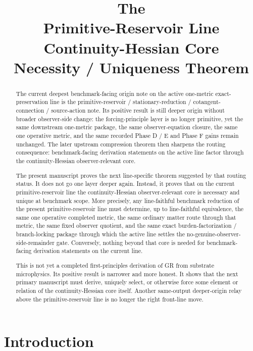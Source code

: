 \documentclass[11pt]{article}
\title{\textbf{The \TheoryName{}}\\[0.4em]
\large Primitive-Reservoir Line Continuity-Hessian Core\\
\large Necessity / Uniqueness Theorem}
\author{}
\date{}
\begin{document}
\maketitle

\begin{abstract}
The current deepest benchmark-facing origin note on the active one-metric exact-preservation line is the primitive-reservoir / stationary-reduction / cotangent-connection / source-action note. Its positive result is still deeper origin without broader observer-side change: the forcing-principle layer is no longer primitive, yet the same downstream one-metric package, the same observer-equation closure, the same one operative metric, and the same recorded Phase D / E and Phase F gains remain unchanged. The later upstream compression theorem then sharpens the routing consequence: benchmark-facing derivation statements on the active line factor through the continuity-Hessian observer-relevant core.

The present manuscript proves the next line-specific theorem suggested by that routing status. It does not go one layer deeper again. Instead, it proves that on the current primitive-reservoir line the continuity-Hessian observer-relevant core is necessary and unique at benchmark scope. More precisely, any line-faithful benchmark reduction of the present primitive-reservoir line must determine, up to line-faithful equivalence, the same one operative completed metric, the same ordinary matter route through that metric, the same fixed observer quotient, and the same exact burden-factorization / branch-locking package through which the active line settles the no-genuine-observer-side-remainder gate. Conversely, nothing beyond that core is needed for benchmark-facing derivation statements on the current line.

This is not yet a completed first-principles derivation of GR from substrate microphysics. Its positive result is narrower and more honest. It shows that the next primary manuscript must derive, uniquely select, or otherwise force some element or relation of the continuity-Hessian core itself. Another same-output deeper-origin relay above the primitive-reservoir line is no longer the right front-line move.
\end{abstract}

\section{Introduction}
\end{document}
